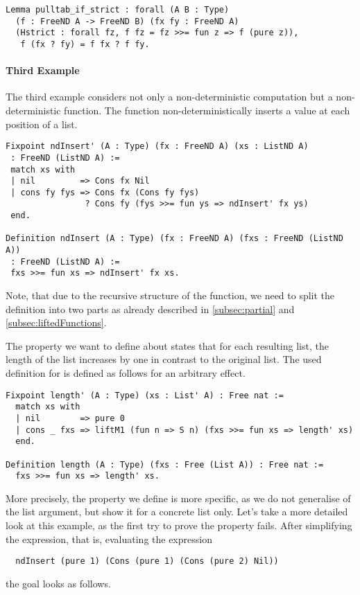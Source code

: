 \begin{verbatim}
Lemma pulltab_if_strict : forall (A B : Type)
  (f : FreeND A -> FreeND B) (fx fy : FreeND A)
  (Hstrict : forall fz, f fz = fz >>= fun z => f (pure z)),
   f (fx ? fy) = f fx ? f fy.
\end{verbatim}


\paragraph{Third Example}
The third example considers not only a non-deterministic computation
but a non-deterministic function.
The function  non-deterministically inserts a value at
each position of a list.

\begin{verbatim}
Fixpoint ndInsert' (A : Type) (fx : FreeND A) (xs : ListND A)
 : FreeND (ListND A) :=
 match xs with
 | nil         => Cons fx Nil
 | cons fy fys => Cons fx (Cons fy fys)
                ? Cons fy (fys >>= fun ys => ndInsert' fx ys)
 end.

Definition ndInsert (A : Type) (fx : FreeND A) (fxs : FreeND (ListND A))
 : FreeND (ListND A) :=
 fxs >>= fun xs => ndInsert' fx xs.
\end{verbatim}

Note, that due to the recursive structure of the function, we need to
split the definition into two parts as already described
in \autoref{subsec:partial} and \autoref{subsec:liftedFunctions}.

The property we want to define about  states that for
each resulting list, the length of the list increases by one in
contrast to the original list.
The used definition for  is defined as follows for an
arbitrary effect.

\begin{verbatim}
Fixpoint length' (A : Type) (xs : List' A) : Free nat :=
  match xs with
  | nil        => pure 0
  | cons _ fxs => liftM1 (fun n => S n) (fxs >>= fun xs => length' xs)
  end.

Definition length (A : Type) (fxs : Free (List A)) : Free nat :=
  fxs >>= fun xs => length' xs.
\end{verbatim}
  
More precisely, the property we define is more specific, as we do not
generalise of the list argument, but show it for a concrete list only.
Let's take a more detailed look at this example, as the first try to
prove the property fails.
After simplifying the expression, that is, evaluating the expression
\begin{verbatim}
  ndInsert (pure 1) (Cons (pure 1) (Cons (pure 2) Nil))
\end{verbatim}
the goal looks as follows.

